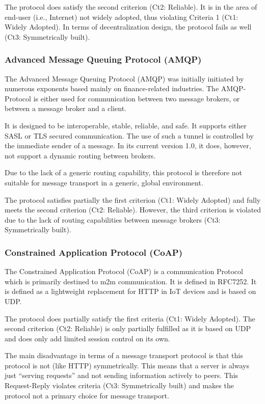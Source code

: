 The protocol does satisfy the second criterion (Ct2: Reliable). It is in the area of end-user (i.e., Internet) not widely adopted, thus violating Criteria 1 (Ct1: Widely Adopted). In terms of decentralization design, the protocol fails as well (Ct3: Symmetrically built).

\subsubsection{Advanced Message Queuing Protocol (AMQP)}
The Advanced Message Queuing Protocol (AMQP) was initially initiated by numerous exponents based mainly on finance-related industries. The AMQP-Protocol is either used for communication between two message brokers, or between a message broker and a client\cite{amqp}.

It is designed to be interoperable, stable, reliable, and safe. It supports either SASL or TLS secured communication. The use of such a tunnel is controlled by the immediate sender of a message. In its current version 1.0, it does, however, not support a dynamic routing between brokers\cite{amqp}.

Due to the lack of a generic routing capability, this protocol is therefore not suitable for message transport in a generic, global environment.

The protocol satisfies partially the first criterion (Ct1: Widely Adopted) and fully meets the second criterion (Ct2: Reliable). However, the third criterion is violated due to the lack of routing capabilities between message brokers (Ct3: Symmetrically built).

\subsubsection{Constrained Application Protocol (CoAP)}
The Constrained Application Protocol (CoAP) is a communication Protocol which is primarily destined to m2m communication. It is defined in RFC7252\cite{rfc7252}.  It is defined as a lightweight replacement for HTTP in IoT devices and is based on UDP.

The protocol does partially satisfy the first criteria (Ct1: Widely Adopted). The second criterion (Ct2: Reliable) is only partially fulfilled as it is based on UDP and does only add limited session control on its own.

The main disadvantage in terms of a message transport protocol is that this protocol is not (like HTTP) symmetrically. This means that a server is always just ``serving requests'' and not sending information actively to peers. This Request-Reply violates criteria (Ct3: Symmetrically built) and makes the protocol not a primary choice for message transport. 

